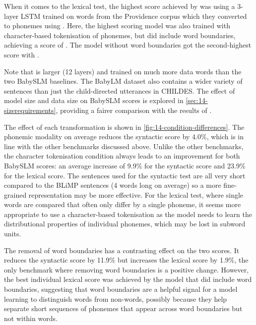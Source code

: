 When it comes to the lexical test, the highest score achieved by \citet{lavechin} was  using a 3-layer LSTM trained on  words from the Providence corpus \citep{borschinger-etal-2013-joint} which they converted to phonemes using . Here, the highest scoring model was also trained with character-based tokenisation of phonemes, but did include word boundaries, achieving a score of . The model without word boundaries got the second-highest score with .

Note that \gpt is larger (12 layers) and trained on much more data  words than the two BabySLM baselines. The BabyLM dataset also contains a wider variety of sentences than just the child-directed utterances in CHILDES. The effect of model size and data size on BabySLM scores is explored in \cref{sec:14-sizerequirements}, providing a fairer comparison with the results of \citet{lavechin}.


The effect of each transformation is shown in \cref{fig:14-condition-differences}. The phonemic modality on average reduces the syntactic score by 4.0\%, which is in line with the other benchmarks discussed above. Unlike the other benchmarks, the character tokenisation condition always leads to an improvement for both BabySLM scores: an average increase of 9.9\% for the syntactic score and 23.9\% for the lexical score. The sentences used for the syntactic test are all very short compared to the BLiMP sentences (4 words long on average) so a more fine-grained representation may be more effective. For the lexical test, where single words are compared that often only differ by a single phoneme, it seems more appropriate to use a character-based tokenisation as the model needs to learn the distributional properties of individual phonemes, which may be lost in subword units. 

The removal of word boundaries has a contrasting effect on the two scores. It reduces the syntactic score by 11.9\% but increases the lexical score by 1.9\%, the only benchmark where removing word boundaries is a positive change. However, the best individual lexical score was achieved by the model that did include word boundaries, suggesting that word boundaries are a helpful signal for a model learning to distinguish words from non-words, possibly because they help separate short sequences of phonemes that appear across word boundaries but not within words. 

